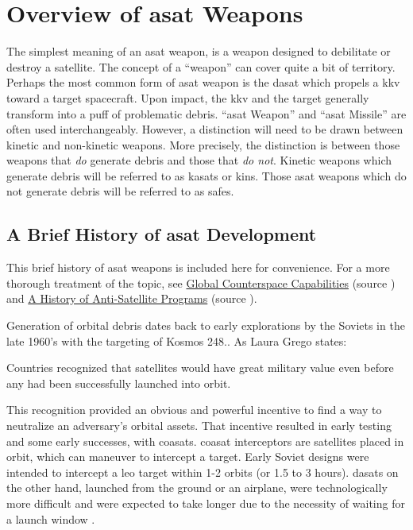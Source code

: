 \section{Overview of \acf{asat} Weapons}

The simplest meaning of an \acf{asat} weapon, is a weapon designed to
debilitate or destroy a satellite.  The concept of a ``weapon'' can
cover quite a bit of territory.  Perhaps the most common form of
\ac{asat} weapon is the \ac{dasat} which propels a \ac{kkv} toward a
target spacecraft.  Upon impact, the \ac{kkv} and the target generally
transform into a puff of problematic debris.  ``\acs{asat} Weapon''
and ``\acs{asat} Missile'' are often used interchangeably.  However, a
distinction will need to be drawn between kinetic and non-kinetic
weapons.  More precisely, the distinction is between those weapons
that \emph{do} generate debris and those that \emph{do not}.  Kinetic
weapons which generate debris will be referred to as \acp{kasat} or
\acp{kin}.  Those \ac{asat} weapons which do not generate debris will
be referred to as \acp{safe}.

\subsection{A Brief History of \ac{asat} Development}

This brief history of \ac{asat} weapons is included here for
convenience.  For a more thorough treatment of the topic, see
\href{https://swfound.org/media/207344/swf_global_counterspace_capabilities_2022.pdf}{Global
  Counterspace Capabilities} (source \cite{brian}) and
\href{https://www.ucsusa.org/sites/default/files/2019-09/a-history-of-ASAT-programs_lo-res.pdf}{A
  History of Anti-Satellite Programs} (source \cite{grego}).

Generation of orbital debris dates back to early explorations by the
Soviets in the late 1960's with the targeting of Kosmos
248.\cite[p05-01]{brian}.  As Laura Grego states:
\begin{blockquote}
  Countries recognized that satellites would have great military value
  even before any had been successfully launched into
  orbit.\cite[p2]{grego}
\end{blockquote}

This recognition provided an obvious and powerful incentive to find a
way to neutralize an adversary's orbital assets. That incentive
resulted in early testing and some early successes, with \acp{coasat}.
\acs{coasat} interceptors are satellites placed in orbit, which can
maneuver to intercept a target.  Early Soviet designs were intended to
intercept a \ac{leo} target within 1-2 orbits (or 1.5 to 3 hours).
\acp{dasat} on the other hand, launched from the ground or an
airplane, were technologically more difficult\cite[4]{grego} and were
expected to take longer due to the necessity of waiting for a launch
window \cite[3]{grego}.


